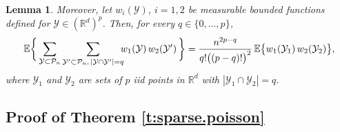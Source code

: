 \documentclass[11pt]{amsart}
\numberwithin{equation}{section}
\theoremstyle{plain}
\newtheorem{lemma}[theorem]{Lemma}
\theoremstyle{definition}
\begin{document}
\begin{lemma}
Moreover, let $w_i({{\mathcal{Y}}})$, $i=1,2$ be measurable bounded functions defined for ${{\mathcal{Y}}} \in ({{\mathbb R}}^d)^p$. Then, for every $q \in \{ 0,\dots, p \}$,
\begin{align*}
{\mathbb{E}} \biggl\{  \, \sum_{{{\mathcal{Y}}} \subset {\mathcal P_n}} \sum_{{{\mathcal{Y}^{\prime}}} \subset {\mathcal P_n}, \, |{{\mathcal{Y}}} \cap {{\mathcal{Y}^{\prime}}}| = q} \hspace{-5pt} w_1({{\mathcal{Y}}})\, w_2({{\mathcal{Y}^{\prime}}})\, \biggr\} = \frac{n^{2p-q}}{q! \bigl( (p-q)! \bigr)^2}\, {\mathbb{E}} \bigl\{  w_1({{\mathcal{Y}}}_1)\, w_2({{\mathcal{Y}}}_2) \bigr\},
\end{align*}
where ${{\mathcal{Y}}}_1$ and ${{\mathcal{Y}}}_2$ are sets of $p$ iid points in ${{\mathbb R}}^d$ with $|{{\mathcal{Y}}}_1 \cap {{\mathcal{Y}}}_2| = q$.
\end{lemma}

\subsection{Proof of Theorem \ref{t:sparse.poisson}}  \label{s:proof.first.regime}
\end{document}
